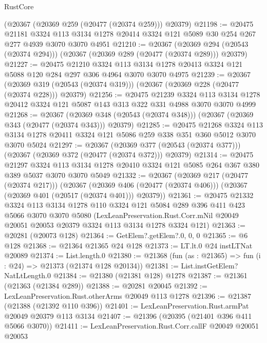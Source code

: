 \begin{lexlean}{RustCore}
\begin{coremodule}
    (@20367 (@20369 @259 (@20477 (@20374 @259))) @20379)
@21198 := @20475
    @21181
    @3324
    @113
    @3134
    @1278
    @20414
    @3324
    @121
    @5089
    @30
    @254
    @267
    @277
    @4939
    @3070
    @3070
    @4951
@21210 := @20367
    (@20369 @294 (@20543 (@20374 @294)))
    (@20367 (@20369 @289 (@20477 (@20374 @289))) @20379)
@21227 := @20475
    @21210
    @3324
    @113
    @3134
    @1278
    @20413
    @3324
    @121
    @5088
    @120
    @284
    @297
    @306
    @4964
    @3070
    @3070
    @4975
@21239 := @20367
    (@20369 @319 (@20543 (@20374 @319)))
    (@20367 (@20369 @228 (@20477 (@20374 @228))) @20379)
@21256 := @20475
    @21239
    @3324
    @113
    @3134
    @1278
    @20412
    @3324
    @121
    @5087
    @143
    @313
    @322
    @331
    @4988
    @3070
    @3070
    @4999
@21268 := @20367
    (@20369 @348 (@20543 (@20374 @348)))
    (@20367 (@20369 @343 (@20477 (@20374 @343))) @20379)
@21285 := @20475
    @21268
    @3324
    @113
    @3134
    @1278
    @20411
    @3324
    @121
    @5086
    @259
    @338
    @351
    @360
    @5012
    @3070
    @3070
    @5024
@21297 := @20367
    (@20369 @377 (@20543 (@20374 @377)))
    (@20367 (@20369 @372 (@20477 (@20374 @372))) @20379)
@21314 := @20475
    @21297
    @3324
    @113
    @3134
    @1278
    @20410
    @3324
    @121
    @5085
    @264
    @367
    @380
    @389
    @5037
    @3070
    @3070
    @5049
@21332 := @20367
    (@20369 @217 (@20477 (@20374 @217)))
    (@20367
      (@20369 @406 (@20477 (@20374 @406)))
      (@20367 (@20369 @401 (@20517 (@20374 @401))) @20379))
@21361 := @20475
    @21332
    @3324
    @113
    @3134
    @1278
    @110
    @3324
    @121
    @5084
    @289
    @396
    @411
    @423
    @5066
    @3070
    @3070
    @5080
    (LexLeanPreservation.Rust.Corr.mNil
      @20049
      @20051
      @20053
      @20379
      @3324
      @113
      @3134
      @1278
      @3324
      @121)
@21363 := @20281 (@20073 @128)
@21364 := GetElem?.getElem?.{0, 0, 0}
@21365 := @6 @128
@21368 := @21364 @21365 @24 @128
@21373 := LT.lt.{0} @24 instLTNat @20089
@21374 := List.length.{0}
@21380 := @21368 (fun (as : @21365) => fun (i : @24) => @21373 (@21374 @128 @20134))
@21381 := List.instGetElem?NatLtLength.{0}
@21384 := @21380 (@21381 @128) @1278
@21387 := @21361 (@21363 (@21384 @289))
@21388 := @20281 @20045
@21392 := LexLeanPreservation.Rust.otherArms @20049 @113 @1278
@21396 := @21387 (@21388 (@21392 @110 @396))
@21401 := LexLeanPreservation.Rust.armPat @20049 @20379 @113 @3134
@21407 := @21396 (@20395 (@21401 @396 @411 @5066 @3070))
@21411 := LexLeanPreservation.Rust.Corr.callF @20049 @20051 @20053

\end{coremodule}
\end{lexlean}
